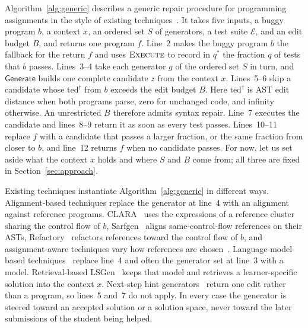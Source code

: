 \documentclass[10pt,conference]{IEEEtran}
\begin{document}
Algorithm~\ref{alg:generic} describes a generic repair procedure for programming assignments in the style of existing techniques~\cite{gulwani2018automated,wang2018search,hu2019re}. It takes five inputs, a buggy program \(b\), a context \(x\), an ordered set \(S\) of generators, a test suite \(\mathcal E\), and an edit budget \(B\), and returns one program \(f\). Line~2 makes the buggy program \(b\) the fallback for the return \(f\) and uses \(\textsc{Execute}\) to record in \(q^*\) the fraction \(q\) of tests that \(b\) passes. Lines~3--4 take each generator \(g\) of the ordered set \(S\) in turn, and \(\mathsf{Generate}\) builds one complete candidate \(z\) from the context \(x\). Lines~5--6 skip a candidate whose \(\mathrm{ted}^{\dagger}\) from \(b\) exceeds the edit budget \(B\). Here \(\mathrm{ted}^{\dagger}\) is AST edit distance when both programs parse, zero for unchanged code, and infinity otherwise. An unrestricted \(B\) therefore admits syntax repair. Line~7 executes the candidate and lines~8--9 return it as soon as every test passes. Lines~10--11 replace \(f\) with a candidate that passes a larger fraction, or the same fraction from closer to \(b\), and line~12 returns \(f\) when no candidate passes. For now, let us set aside what the context \(x\) holds and where \(S\) and \(B\) come from; all three are fixed in Section~\ref{sec:approach}.

Existing techniques instantiate Algorithm~\ref{alg:generic} in different ways. Alignment-based techniques replace the generator at line~4 with an alignment against reference programs. CLARA~\cite{gulwani2018automated} uses the expressions of a reference cluster sharing the control flow of \(b\), Sarfgen~\cite{wang2018search} aligns same-control-flow references on their ASTs, Refactory~\cite{hu2019re} refactors references toward the control flow of \(b\), and assignment-aware techniques vary how references are chosen~\cite{heo2023referent,choi2021automated,choi2025automated}. Language-model-based techniques~\cite{joshi2023repair,zhang2024pydex,phung2023generating,liu2024fastfixer,yang2024cref,zhao2026peer,orvalho2025counterexample} replace line~4 and often the generator set at line~3 with a model. Retrieval-based LSGen~\cite{dai2026learner} keeps that model and retrieves a learner-specific solution into the context \(x\). Next-step hint generators~\cite{piech2015embeddings,rivers2017data,price2017isnap,roest2024next} return one edit rather than a program, so lines~5 and~7 do not apply. In every case the generator is steered toward an accepted solution or a solution space, never toward the later submissions of the student being helped.
\end{document}
